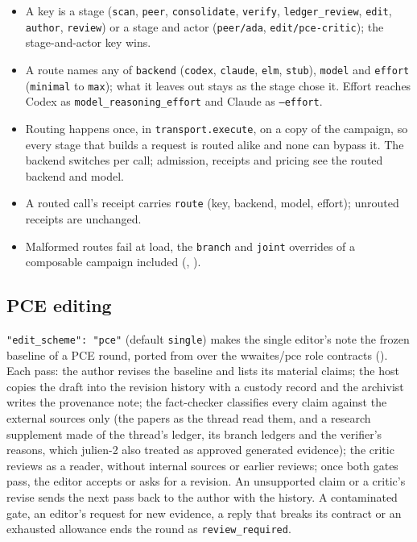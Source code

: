 \documentclass[11pt,a4paper]{article}
\begin{document}
\begin{itemize}[nosep]
\item A key is a stage (\texttt{scan}, \texttt{peer}, \texttt{consolidate}, \texttt{verify},
  \texttt{ledger\_review}, \texttt{edit}, \texttt{author}, \texttt{review}) or a stage and
  actor (\texttt{peer/ada}, \texttt{edit/pce-critic}); the stage-and-actor key wins.
\item A route names any of \texttt{backend} (\texttt{codex}, \texttt{claude}, \texttt{elm},
  \texttt{stub}), \texttt{model} and \texttt{effort} (\texttt{minimal} to \texttt{max});
  what it leaves out stays as the stage chose it. Effort reaches Codex as
  \texttt{model\_reasoning\_effort} and Claude as \texttt{--effort}.
\item Routing happens once, in \texttt{transport.execute}, on a copy of the campaign, so
  every stage that builds a request is routed alike and none can bypass it. The backend
  switches per call; admission, receipts and pricing see the routed backend and model.
\item A routed call's receipt carries \texttt{route} (key, backend, model, effort);
  unrouted receipts are unchanged.
\item Malformed routes fail at load, the \texttt{branch} and \texttt{joint} overrides of a
  composable campaign included (, ).
\end{itemize}

\subsection{PCE editing}

\texttt{"edit\_scheme": "pce"} (default \texttt{single}) makes the single editor's note the
frozen baseline of a PCE round, ported from  over the wwaites/pce role
contracts (). Each pass: the author revises the baseline and lists
its material claims; the host copies the draft into the revision history with a custody
record and the archivist writes the provenance note; the fact-checker classifies every claim
against the external sources only (the papers as the thread read them, and a research
supplement made of the thread's ledger, its branch ledgers and the verifier's reasons, which
julien-2 also treated as approved generated evidence); the critic reviews as a reader,
without internal sources or earlier reviews; once both gates pass, the editor accepts or asks
for a revision. An unsupported claim or a critic's revise sends the next pass back to the
author with the history. A contaminated gate, an editor's request for new evidence, a reply
that breaks its contract or an exhausted allowance ends the round as
\texttt{review\_required}.
\end{document}
